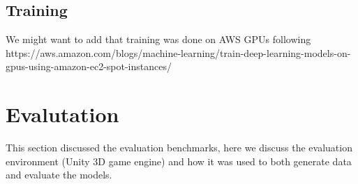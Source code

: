 \subsection{Training}

We might want to add that training was done on AWS GPUs following   
https://aws.amazon.com/blogs/machine-learning/train-deep-learning-models-on-gpus-using-amazon-ec2-spot-instances/  


\section{Evalutation}
This section discussed the evaluation benchmarks, here we discuss the evaluation environment (Unity 3D game engine) and how it was used to both generate data and evaluate the models.



